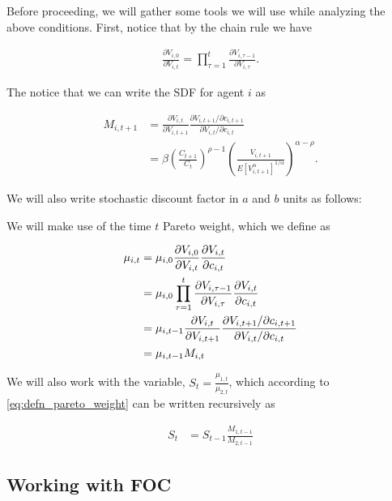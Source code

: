\documentclass[19pt]{article}
\newcommand{\fracpd}[2]{
  \ensuremath{\frac{\partial #1}{\partial #2}}
}
\begin{document}
  Before proceeding, we will gather some tools we will use while analyzing the above conditions. First, notice that by the chain rule we have

  \begin{align} \label{eq:chain_derivs}
    \fracpd{V_{i,0}}{V_{i,t}} = \prod_{\tau=1}^{t} \fracpd{V_{i,\tau-1}}{V_{i,\tau}}.
  \end{align}

  The notice that we can write the SDF for agent $i$ as

  \begin{align*}
    M_{i,t+1} &= \fracpd{V_{i,t}}{V_{i,t+1}} \frac{\partial V_{i,t+1}/ \partial c_{i,t+1}}{\partial V_{i,t}/ \partial c_{i,t}} \\
    &= \beta \left( \frac{C_{t+1}}{C_t} \right)^{\rho - 1} \left( \frac{V_{i,t+1}}{E \left[ V_{i,t+1}^{\alpha} \right]^{1/\alpha}} \right)^{\alpha-\rho}.
  \end{align*}

  We will also write stochastic discount factor in $a$ and $b$ units as follows:



  We will make use of the time $t$ Pareto weight, which we define as

  \begin{align} \label{eq:defn_pareto_weight}
    \mu_{i,t} &= \mu_{i,0} \fracpd{V_{i,0}}{V_{i,t}} \fracpd{V_{i,t}}{c_{i,t}} \notag \\
    &= \mu_{i,0} \prod_{\tau=1}^{t} \fracpd{V_{i,\tau-1}}{V_{i,\tau}} \fracpd{V_{i,t}}{c_{i,t}} \notag  \\
    &= \mu_{i,t-1} \fracpd{V_{i,t}}{V_{i,t+1}} \frac{\partial V_{i,t+1}/ \partial c_{i,t+1}}{\partial V_{i,t}/ \partial c_{i,t}} \notag \\
    &= \mu_{i, t-1} M_{i,t}
  \end{align}

  We will also work with the variable, $S_t = \frac{\mu_{1,t}}{\mu_{2,t}}$, which according to \eqref{eq:defn_pareto_weight} can be written recursively as

  \begin{align*}
    S_t &= S_{t-1} \frac{M_{1,t-1}}{M_{2,t-1}}
  \end{align*}

  \subsection{Working with FOC} \label{sub:Working_with_foc}
\end{document}
